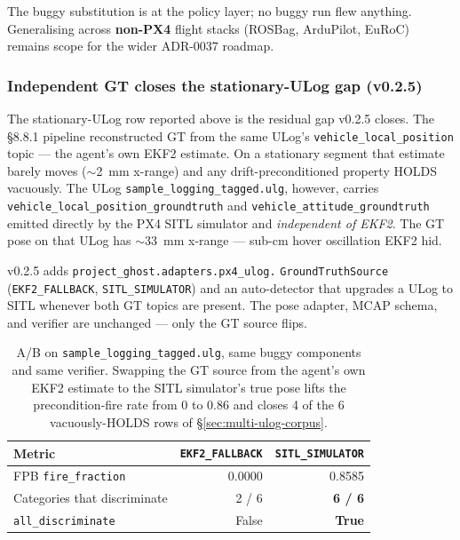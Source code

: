\documentclass[acmsmall,nonacm=true,review=false]{acmart}
\theoremstyle{plain}
\begin{document}
The buggy substitution is at the policy layer; no buggy run
flew anything. Generalising across \textbf{non-PX4} flight
stacks (ROSBag, ArduPilot, EuRoC) remains scope for the wider
ADR-0037 roadmap.

\subsubsection*{Independent GT closes the stationary-ULog gap (v0.2.5)}
\label{sec:independent-gt}

The stationary-ULog row reported above is the residual gap
v0.2.5 closes. The §8.8.1 pipeline reconstructed GT from the
same ULog's \texttt{vehicle\_local\_position} topic --- the
agent's own EKF2 estimate. On a stationary segment that estimate
barely moves ($\sim$2~mm x-range) and any drift-preconditioned
property HOLDS vacuously. The ULog
\texttt{sample\_logging\_tagged.ulg}, however, carries
\texttt{vehicle\_local\_position\_groundtruth} and
\texttt{vehicle\_attitude\_groundtruth} emitted directly by the
PX4 SITL simulator and \emph{independent of EKF2}. The GT pose
on that ULog has $\sim$33~mm x-range --- sub-cm hover oscillation
EKF2 hid.

v0.2.5 adds \texttt{project\_ghost.adapters.px4\_ulog.}
\texttt{GroundTruthSource} (\texttt{EKF2\_FALLBACK},
\texttt{SITL\_SIMULATOR}) and an auto-detector that upgrades a
ULog to SITL whenever both GT topics are present. The pose
adapter, MCAP schema, and verifier are unchanged --- only the
GT source flips.

\begin{table}[h]
\centering\small
\begin{tabular}{l r r}
\toprule
\textbf{Metric} & \texttt{EKF2\_FALLBACK} & \texttt{SITL\_SIMULATOR} \\
\midrule
FPB \texttt{fire\_fraction}     & 0.0000 & 0.8585 \\
Categories that discriminate    & 2 / 6  & \textbf{6 / 6} \\
\texttt{all\_discriminate}      & False  & \textbf{True}  \\
\bottomrule
\end{tabular}
\caption{A/B on \texttt{sample\_logging\_tagged.ulg}, same buggy
components and same verifier. Swapping the GT source from the
agent's own EKF2 estimate to the SITL simulator's true pose
lifts the precondition-fire rate from 0 to 0.86 and closes 4 of
the 6 vacuously-HOLDS rows of \S\ref{sec:multi-ulog-corpus}.}
\label{tab:independent-gt-ab}
\end{table}
\end{document}
